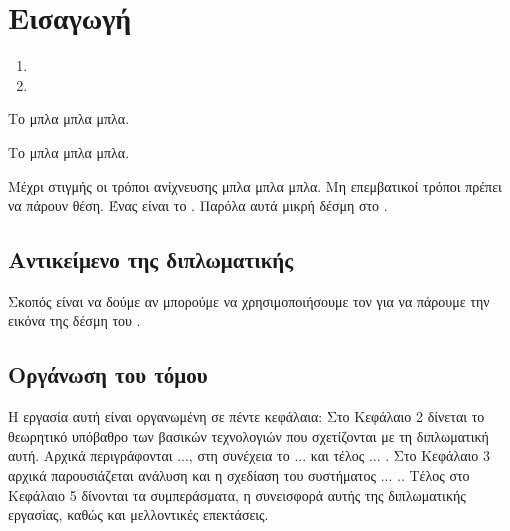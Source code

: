 \chapter{Εισαγωγή}

\begin{enumerate}
\item {}
\item {}
\end{enumerate}

Το  μπλα μπλα μπλα.

Το  μπλα μπλα μπλα.

Μέχρι στιγμής οι τρόποι ανίχνευσης μπλα μπλα μπλα.
Μη επεμβατικοί τρόποι πρέπει να πάρουν θέση. Ένας είναι το . Παρόλα αυτά μικρή δέσμη στο . 

\section{Αντικείμενο της διπλωματικής}
Σκοπός είναι να δούμε αν μπορούμε να χρησιμοποιήσουμε τον  για να πάρουμε την εικόνα της δέσμη του .

\section{Οργάνωση του τόμου}
Η εργασία αυτή είναι οργανωμένη σε πέντε κεφάλαια: Στο Κεφάλαιο 2
δίνεται το θεωρητικό υπόβαθρο των βασικών τεχνολογιών που
σχετίζονται με τη διπλωματική αυτή. Αρχικά περιγράφονται ..., στη συνέχεια το ... και τέλος ... . 
Στο Κεφάλαιο 3 αρχικά παρουσιάζεται ανάλυση και η σχεδίαση του συστήματος ... .. Τέλος στο Κεφάλαιο 5 δίνονται τα συμπεράσματα, η συνεισφορά αυτής της
διπλωματικής εργασίας, καθώς και μελλοντικές επεκτάσεις.
